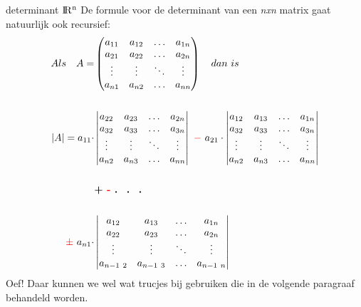 \mydef
{determinant  ${\rm I\!R^{n}}$}
{De formule voor de determinant van een \textit{nxn} matrix gaat natuurlijk ook recursief:   \begin{align*}
	Als \quad A  = 
	&\begin{pmatrix}
	a_{11} &  a_{12}  & \ldots & a_{1n}\\
	a_{21}  &  a_{22} & \ldots & a_{2n}\\
	\vdots & \vdots & \ddots & \vdots\\
	a_{n1}  &   a_{n2}       &\ldots & a_{nn}
	\end{pmatrix} 	 \quad  dan \  is  \\ \\
	|A| = a_{11} \cdot    	 
	&\begin{vmatrix}
	a_{22}  &  a_{23} & \ldots & a_{2n}\\
	a_{32}  &  a_{33} & \ldots & a_{3n}\\
	\vdots & \vdots & \ddots & \vdots\\
	a_{n2}  &   a_{n3}       &\ldots & a_{nn}
	\end{vmatrix} 
	\ {\color{red}-}  \ a_{21} \cdot  	
	\begin{vmatrix}
	a_{12} &  a_{13}  & \ldots & a_{1n}\\
	a_{32}  &  a_{33} & \ldots & a_{3n}\\
	\vdots & \vdots & \ddots & \vdots\\
	a_{n2}  &   a_{n3}       &\ldots & a_{nn}
	\end{vmatrix} \\ \\
	&\textbf{+ {\color{red}-}  . \  . \ . }\\ \\
	{\color{red}\pm \ } a_{n1} \cdot    
	&\begin{vmatrix}
	a_{12} &  a_{13}  & \ldots & a_{1n}\\
	a_{22}  &  a_{23} & \ldots & a_{2n}\\
	\vdots & \vdots & \ddots & \vdots\\
	a_{n-1 \ 2}  &   a_{n-1 \ 3}       &\ldots & a_{n-1 \ n}
	\end{vmatrix} 
	\end{align*}
}
Oef! Daar kunnen we wel wat trucjes bij gebruiken die in de volgende paragraaf behandeld worden.
